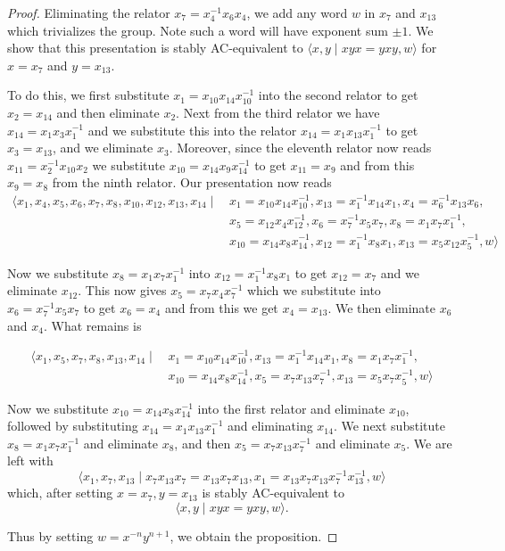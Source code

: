 \begin{proof}

Eliminating the relator $x_7=x_4^{-1} x_6 x_4$, we add any word $w$ in $x_7$ and $x_{13}$ which trivializes the group. Note such a word will have exponent sum $\pm 1$. We show that this presentation is stably AC-equivalent to $\langle x,y \mid xyx=yxy, w\rangle$ for $x=x_7$ and $y=x_{13}$.

To do this, we first substitute $x_1=x_{10} x_{14} x_{10}^{-1}$ into the second relator to get $x_2=x_{14}$ and then eliminate $x_2$. Next from the third relator we have $x_{14}=x_{1} x_{3} x_1^{-1}$ and we substitute this into the relator $x_{14}=x_1 x_{13} x_1^{-1}$ to get $x_3=x_{13}$, and we eliminate $x_3$. Moreover, since the eleventh relator now reads $x_{11}=x_2^{-1} x_{10} x_2$ we substitute $x_{10}=x_{14}x_9x_{14}^{-1}$ to get $x_{11}=x_9$ and from this $x_9=x_8$ from the ninth relator.  Our presentation now reads
\[ \begin{aligned} \langle x_1, x_4, x_5, x_6, x_7, x_8, x_{10}, x_{12}, x_{13}, x_{14} \mid \, & x_1= x_{10} x_{14} x_{10}^{-1}, x_{13}= x_1^{-1} x_{14} x_{1}, x_4= x_6^{-1} x_{13} x_{6},\\
& x_5= x_{12} x_{4} x_{12}^{-1},x_6= x_7^{-1} x_{5} x_{7},x_8= x_{1} x_{7} x_1^{-1}, \\
&x_{10}= x_{14} x_{8} x_{14}^{-1}, x_{12}= x_1^{-1} x_{8} x_{1},x_{13}= x_{5} x_{12} x_5^{-1}, w\rangle  \end{aligned} \]

Now we substitute $x_8=x_1 x_7 x_1^{-1}$ into $x_{12}=x_1^{-1} x_8 x_1$ to get $x_{12}=x_7$ and we eliminate $x_{12}$. This now gives $x_5=x_7 x_4 x_7^{-1}$ which we substitute into $x_6= x_7^{-1} x_{5} x_{7}$ to get $x_6=x_4$ and from this we get $x_4=x_{13}$. We then eliminate $x_6$ and $x_4$. What remains is 

\[ \begin{aligned} \langle x_1, x_5, x_7, x_8, x_{13}, x_{14}\mid\, & x_1= x_{10} x_{14} x_{10}^{-1},x_{13}=x_1^{-1} x_{14} x_{1},x_8= x_{1} x_{7} x_1^{-1},\\
&x_{10}= x_{14} x_{8} x_{14}^{-1},x_5= x_{7} x_{13} x_7^{-1}, x_{13}= x_{5} x_{7} x_5^{-1}, w \rangle \end{aligned} \] 

Now we substitute $x_{10} = x_{14}x_8 x_{14}^{-1}$ into the first relator and eliminate $x_{10}$, followed by substituting $x_{14}=x_{1} x_{13} x_1^{-1}$ and eliminating $x_{14}$. We next substitute $x_8=x_1 x_7 x_1^{-1}$ and eliminate $x_8$, and then $x_5=x_7 x_{13} x_{7}^{-1}$ and eliminate $x_5$. We are left with 
\[ \langle x_1, x_7, x_{13} \mid  x_7 x_{13} x_7 = x_{13} x_7 x_{13}, x_1 = x_{13} x_7 x_{13} x_7^{-1} x_{13}^{-1}, w  \rangle \] which, after setting $x=x_7, y=x_{13}$ is stably AC-equivalent to 
\[
\langle x,y \mid xyx=yxy, w\rangle.
\]

Thus by setting $w=x^{-n}y^{n+1}$, we obtain the proposition.

\end{proof}





